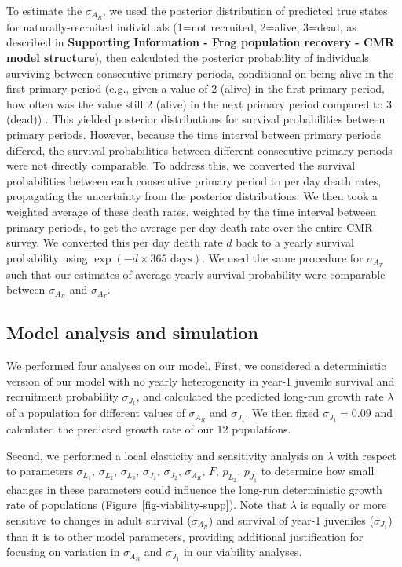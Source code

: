\documentclass[9pt,twoside,lineno]{pnas-new-SI}
\begin{document}
To estimate the \(\sigma_{A_R}\), we used the posterior distribution of
predicted true states for naturally-recruited individuals (1=not
recruited, 2=alive, 3=dead, as described in \textbf{Supporting
Information - Frog population recovery - CMR model structure}), then
calculated the posterior probability of individuals surviving between
consecutive primary periods, conditional on being alive in the first
primary period (e.g., given a value of 2 (alive) in the first primary
period, how often was the value still 2 (alive) in the next primary
period compared to 3 (dead)) . This yielded posterior distributions for
survival probabilities between primary periods. However, because the
time interval between primary periods differed, the survival
probabilities between different consecutive primary periods were not
directly comparable. To address this, we converted the survival
probabilities between each consecutive primary period to per day death
rates, propagating the uncertainty from the posterior distributions. We
then took a weighted average of these death rates, weighted by the time
interval between primary periods, to get the average per day death rate
over the entire CMR survey. We converted this per day death rate \(d\)
back to a yearly survival probability using
\(\exp(-d \times 365 \text{ days})\). We used the same procedure for
\(\sigma_{A_T}\) such that our estimates of average yearly survival
probability were comparable between \(\sigma_{A_R}\) and
\(\sigma_{A_T}\).

\hypertarget{model-analysis-and-simulation}{%
\subsection{Model analysis and
simulation}\label{model-analysis-and-simulation}}

We performed four analyses on our model. First, we considered a
deterministic version of our model with no yearly heterogeneity in
year-1 juvenile survival and recruitment probability \(\sigma_{J_1}\),
and calculated the predicted long-run growth rate \(\lambda\) of a
population for different values of \(\sigma_{A_R}\) and
\(\sigma_{J_1}\). We then fixed \(\sigma_{J_1} = 0.09\) and calculated
the predicted growth rate of our 12 populations.

Second, we performed a local elasticity and sensitivity analysis on
\(\lambda\) with respect to parameters \(\sigma_{L_1}\),
\(\sigma_{L_2}\), \(\sigma_{L_3}\), \(\sigma_{J_1}\), \(\sigma_{J_2}\),
\(\sigma_{A_R}\), \(F\), \(p_{L_2}\), \(p_{J_1}\) to determine how small
changes in these parameters could influence the long-run deterministic
growth rate of populations (Figure~\ref{fig-viability-supp}). Note
that \(\lambda\) is equally or more sensitive to changes in adult
survival (\(\sigma_{A_R}\)) and survival of year-1 juveniles
(\(\sigma_{J_1}\)) than it is to other model parameters, providing
additional justification for focusing on variation in \(\sigma_{A_R}\)
and \(\sigma_{J_1}\) in our viability analyses.
\end{document}
